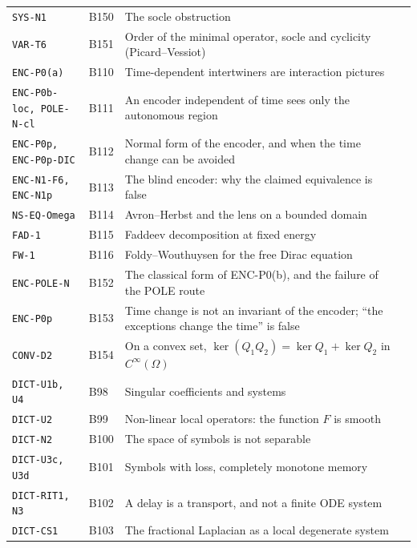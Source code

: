 \begin{center}
\begin{longtable}{@{}L{3.6cm}L{1.2cm}L{8.0cm}L{1.2cm}@{}}
\texttt{SYS-N1} & B150 & The socle obstruction & \pageref{dim:SYS-N1}\\
\texttt{VAR-T6} & B151 & Order of the minimal operator, socle and cyclicity (Picard--Vessiot) & \pageref{dim:VAR-T6}\\
\texttt{ENC-P0(a)} & B110 & Time-dependent intertwiners are interaction pictures & \pageref{dim:ENC-P0(a)}\\
\texttt{ENC-P0b-loc, POLE-N-cl} & B111 & An encoder independent of time sees only the autonomous region & \pageref{dim:ENC-P0b-loc, POLE-N-cl}\\
\texttt{ENC-P0p, ENC-P0p-DIC} & B112 & Normal form of the encoder, and when the time change can be avoided & \pageref{dim:ENC-P0p, ENC-P0p-DIC}\\
\texttt{ENC-N1-F6, ENC-N1p} & B113 & The blind encoder: why the claimed equivalence is false & \pageref{dim:ENC-N1-F6, ENC-N1p}\\
\texttt{NS-EQ-Omega} & B114 & Avron--Herbst and the lens on a bounded domain & \pageref{dim:NS-EQ-Omega}\\
\texttt{FAD-1} & B115 & Faddeev decomposition at fixed energy & \pageref{dim:FAD-1}\\
\texttt{FW-1} & B116 & Foldy--Wouthuysen for the free Dirac equation & \pageref{dim:FW-1}\\
\texttt{ENC-POLE-N} & B152 & The classical form of ENC-P0(b), and the failure of the POLE route & \pageref{dim:ENC-POLE-N}\\
\texttt{ENC-P0p} & B153 & Time change is not an invariant of the encoder; ``the exceptions change the time'' is false & \pageref{dim:ENC-P0p}\\
\texttt{CONV-D2} & B154 & On a convex set, $\ker(Q_1Q_2)=\ker Q_1+\ker Q_2$ in $C^\infty(\Omega)$ & \pageref{dim:CONV-D2}\\
\texttt{DICT-U1b, U4} & B98 & Singular coefficients and systems & \pageref{dim:DICT-U1b, U4}\\
\texttt{DICT-U2} & B99 & Non-linear local operators: the function $F$ is smooth & \pageref{dim:DICT-U2}\\
\texttt{DICT-N2} & B100 & The space of symbols is not separable & \pageref{dim:DICT-N2}\\
\texttt{DICT-U3c, U3d} & B101 & Symbols with loss, completely monotone memory & \pageref{dim:DICT-U3c, U3d}\\
\texttt{DICT-RIT1, N3} & B102 & A delay is a transport, and not a finite ODE system & \pageref{dim:DICT-RIT1, N3}\\
\texttt{DICT-CS1} & B103 & The fractional Laplacian as a local degenerate system & \pageref{dim:DICT-CS1}\\

\end{longtable}
\end{center}
